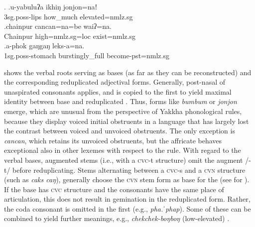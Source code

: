 \ex. \ag.u-yabuluʔa ikhiŋ jonjon=naǃ\\
		{\sc 3sg.poss}-lips how\_much elevated{\sc =nmlz.sg}\\
 	\bg.chainpur cancan=na=be waiʔ=na.\\
	Chainpur high{\sc =nmlz.sg=loc} exist{\sc [3sg]=nmlz.sg}		\\
		\bg.a-phok gaŋgaŋ leks-a=na.\\
	{\sc 1sg.poss}-stomach burstingly\_full  become{\sc [3sg]-pst=nmlz.sg}		\\

  shows the verbal roots serving as bases (as far as they can be reconstructed) and the corresponding reduplicated adjectival forms. Generally, post-nasal  of unaspirated consonants applies, and is copied to the first  to yield maximal identity between base and reduplicated . Thus, forms like \emph{bumbum} or \emph{jonjon} emerge, which are unusual from the perspective of Yakkha phonological rules, because they display voiced initial obstruents in a language that has largely lost the contrast between voiced and unvoiced obstruents. The only exception is \emph{cancan}, which retains its unvoiced obstruents, but the affricate behaves exceptional also in other lexemes with respect to the  rule. With regard to the verbal bases, augmented stems (i.e., with a \textsc{cvc}-t structure) omit the augment /-t/ before reduplicating. Stems alternating between a \textsc{cvc}-s and a \textsc{cvn} structure (such as \emph{caks \ti caŋ}), generally choose the \textsc{cvn} stem form as base for the  (see   for ). If the base has \textsc{cvc} structure and the consonants have the same place of articulation, this does not result in gemination in the reduplicated form. Rather, the coda consonant is omitted in the first  (e.g., \emph{pha.ˈphap}). Some of these  can be combined to yield further meanings, e.g., \emph{chekchek-boŋboŋ} (low-elevated) . 

